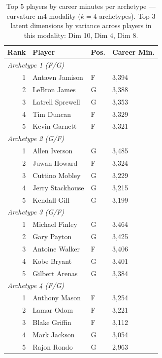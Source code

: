 \begin{table}[htbp]
  \centering\small
  \begin{tabular}{rlll}
    \toprule
    Rank & Player & Pos. & Career Min. \\
    \midrule
    \multicolumn{4}{l}{\textit{Archetype 1 (F/G)}} \\
    \midrule
    1 & Antawn Jamison & F & 3,394 \\
    2 & LeBron James & G & 3,388 \\
    3 & Latrell Sprewell & G & 3,353 \\
    4 & Tim Duncan & F & 3,329 \\
    5 & Kevin Garnett & F & 3,321 \\
    \midrule[0.4pt]
    \multicolumn{4}{l}{\textit{Archetype 2 (G/F)}} \\
    \midrule
    1 & Allen Iverson & G & 3,485 \\
    2 & Juwan Howard & F & 3,324 \\
    3 & Cuttino Mobley & G & 3,229 \\
    4 & Jerry Stackhouse & G & 3,215 \\
    5 & Kendall Gill & G & 3,199 \\
    \midrule[0.4pt]
    \multicolumn{4}{l}{\textit{Archetype 3 (G/F)}} \\
    \midrule
    1 & Michael Finley & G & 3,464 \\
    2 & Gary Payton & G & 3,425 \\
    3 & Antoine Walker & F & 3,406 \\
    4 & Kobe Bryant & G & 3,401 \\
    5 & Gilbert Arenas & G & 3,384 \\
    \midrule[0.4pt]
    \multicolumn{4}{l}{\textit{Archetype 4 (F/G)}} \\
    \midrule
    1 & Anthony Mason & F & 3,254 \\
    2 & Lamar Odom & F & 3,221 \\
    3 & Blake Griffin & F & 3,112 \\
    4 & Mark Jackson & G & 3,054 \\
    5 & Rajon Rondo & G & 2,963 \\
    \bottomrule
  \end{tabular}
  \caption{Top 5 players by career minutes per archetype --- curvature-m4 modality ($k=4$ archetypes). Top-3 latent dimensions by variance across players in this modality: Dim 10, Dim 4, Dim 8.}
  \label{tab:arch_reps_curvature_m4}
\end{table}

